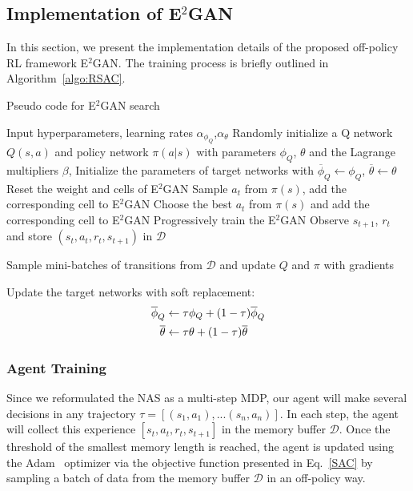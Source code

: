 \documentclass[runningheads]{llncs}
\begin{document}
\subsection{Implementation of E$^2$GAN}
In this section, we present the implementation details of the proposed off-policy RL framework E$^2$GAN.  The training process is briefly outlined in Algorithm~\ref{algo:RSAC}.
\begin{algorithm}[tb]
   \caption{Pseudo code for E$^2$GAN  search}
   \label{algo:RSAC}
\begin{algorithmic}
    \STATE Input hyperparameters, learning rates $\alpha_{\phi_{Q}}$,$\alpha_\theta$
   \STATE Randomly initialize a Q network $Q(s, a)$ and policy network $\pi(a|s)$ with parameters $\phi_{Q}$,  $\theta$ and the Lagrange multipliers $\beta$, 
    \STATE Initialize the parameters of target networks with $\overline{\phi}_{Q}\leftarrow\phi_{Q}$,  $\overline{\theta}\leftarrow\theta$
   \STATE Reset the weight and cells of E$^2$GAN
   \STATE Sample $a_t$ from $\pi(s)$, add the corresponding cell to E$^2$GAN
    \STATE Choose the best $a_t$ from $\pi(s)$ and add the corresponding cell to E$^2$GAN
   \ENDIF
   \STATE Progressively train the E$^2$GAN
   \STATE Observe $s_{t+1}$, $r_{t}$ and store $(s_t,a_t,r_t,s_{t+1})$ in $\mathcal{D}$
  
   \ENDFOR
   \STATE Sample mini-batches of transitions from $\mathcal{D}$ and update $Q$ and $\pi$ with gradients

    \STATE Update the target networks with soft replacement:
          \begin{align}
            \overline{\phi}_{Q} &\leftarrow \tau \phi_{Q} + (1 - \tau) \overline{\phi}_{Q} \notag \\
            \overline{\theta} &\leftarrow \tau \theta +(1 - \tau) \overline{\theta} \notag
          \end{align}
   \ENDFOR
   \ENDFOR

\end{algorithmic}
\end{algorithm}





\subsubsection{Agent Training}
Since we reformulated the NAS as a multi-step MDP, our agent will make several decisions in any trajectory $\tau=[(s_1,a_1),...(s_n,a_n)]$. In each step, the agent will collect this experience $[s_t,a_t,r_t,s_{t+1}]$ in the memory buffer $\mathcal{D}$. Once the threshold of the smallest memory length is reached, the agent is updated using the Adam~\cite{kingma2014adam} optimizer via the objective function presented in Eq.~\ref{SAC} by sampling a batch of data from the memory buffer $\mathcal{D}$ in an off-policy way.
\end{document}
